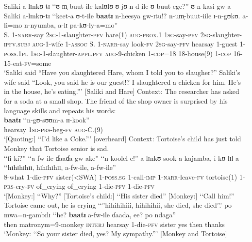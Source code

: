 \begin{exe}
\ex\label{exBaatiHare}
\gll Saliki a-lɪnkʊ-tɪ \textup{\lq\lq}ʊ-m̩-buut-ile kalʊlʊ ʊ-jʊ n-d-ile ʊ-buut-ege?\textup{''} ʊ-n-kasi gw-a Saliki a-lɪnkʊ-tɪ \textup{\lq\lq}keet-a ʊ-t-ile \textbf{baatɪ} n-heesya gw-ɪtu!? n-um̩-buut-iile ɪ-n-gʊkʊ. a-li=mo n-nyumba, a-lɪ pa-kʊ-ly-a=mo\textup{''}\\
S. 1-\textsc{narr}-say \phantom{\lq\lq}\textsc{2sg}-1-slaughter-\textsc{pfv} hare(1) \textsc{aug}-\textsc{prox.1} \textsc{1sg}-say-\textsc{pfv} \textsc{2sg}-slaughter-\textsc{ipfv.subj} \textsc{aug}-1-wife 1-\textsc{assoc} S. 1-\textsc{narr}-say \phantom{\lq\lq}look-\textsc{fv} \textsc{2sg}-say-\textsc{pfv} hearsay 1-guest 1-\textsc{poss.1pl} \textsc{1sg}-1-slaughter-\textsc{appl.pfv} \textsc{aug}-9-chicken 1-\textsc{cop}=18 18-house(9) 1-\textsc{cop} 16-15-eat-\textsc{fv}=some\\
\glt `Saliki said ``Have you slaughtered Hare, whom I told you to slaugher?'' Saliki's wife said ``Look, you said he is our guest!? I slaughtered a chicken for him. He's in the house, he's eating.''{}' [Saliki and Hare]
\ex \label{exBaatiDuka}
Context: The researcher has asked for a soda at a small shop. The friend of the shop owner is surprised by his language skills and repeats his words:\\
\gll \textbf{baatɪ} \textup{\lq\lq}n-gʊ-sʊʊm-a ɪɪ-kook\textup{''}\\
hearsay \phantom{\lq\lq}\textsc{1sg}-\textsc{prs}-beg-\textsc{fv} \textsc{aug}-C.(9)\\
\glt \lq [Quoting:] \lq\lq I'd like a Coke.''{}' [overheard]
\ex\label{exBaatiMonkeyAndTortoise}
Context: Tortoise's child has just told Monkey that Tortoise senior is sad.\\
\gll \textup{\lq\lq}fi-ki?\textup{''} \textup{\lq\lq}a-fw-ile ɗaaɗa gw-ake\textup{''} \textup{\lq\lq}n-koolel-e!\textup{''} a-lɪnkʊ-sook-a kajamba, i-kʊ-lɪl-a \textup{\lq\lq}hɪhɪhɪhɪɪ, hɪhɪhɪhɪɪ, a-fw-ile, a-fw-ile\textup{''}\\
\phantom{\lq\lq}8-what \phantom{\lq\lq}1-die-\textsc{pfv} sister(<SWA) 1-\textsc{poss.sg} \phantom{\lq\lq}1-call-\textsc{imp} 1-\textsc{narr}-leave-\textsc{fv} tortoise(1) 1-\textsc{prs}-cry-\textsc{fv} \phantom{\lq\lq}of\_crying of\_crying 1-die-\textsc{pfv} 1-die-\textsc{pfv}\\
\glt \lq [Monkey:] \lq\lq Why?'' [Tortoise's child:] \lq\lq His sister died'' [Monkey:] \lq\lq Call him!'' Tortoise came out, he is crying \lq\lq ''hihihihiii, hihihihii, she died, she died''.'
\sn \gll po mwa=n-gambɪlɪ \textup{\lq\lq}he? \textbf{baatɪ} a-fw-ile ɗaada, ee? po ndaga\textup{''}\\
then matronym=9-monkey \phantom{\lq\lq}\textsc{interj} hearsay 1-die-\textsc{pfv} sister yes then thanks\\
\glt \lq  Monkey: \lq\lq So your sister died, yes? My sympathy.''{}' [Monkey and Tortoise]
\end{exe}

